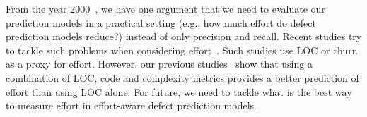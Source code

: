 From the year 2000~\cite{Fenton2000ICSE}, we have one argument that we need to evaluate our prediction models in a practical setting (e.g., how much effort do defect prediction models reduce?) instead of only precision and recall. Recent studies try to tackle such problems when considering effort~\cite{Kamei2010ICSM,Mende2010CSMR}. Such studies use LOC or churn as a proxy for effort.
However, our previous studies~\cite{Shihab2013IST} show that using a combination of LOC, code and complexity metrics provides a better prediction of effort than using LOC alone. For future, we need to tackle what is the best way to measure effort in effort-aware defect prediction models. 

